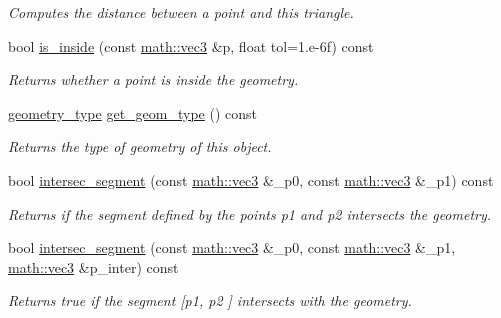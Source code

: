 \begin{DoxyCompactItemize}
\begin{DoxyCompactList}\small\item\em Computes the distance between a point and this triangle. \end{DoxyCompactList}\item 
bool \hyperlink{classphysim_1_1geometric_1_1triangle_a735cfae7db71f5d6105011c40595ca37}{is\+\_\+inside} (const \hyperlink{structphysim_1_1math_1_1vec3}{math\+::vec3} \&p, float tol=1.e-\/6f) const
\begin{DoxyCompactList}\small\item\em Returns whether a point is inside the geometry. \end{DoxyCompactList}\item 
\mbox{\label{classphysim_1_1geometric_1_1triangle_aaf161d99b93feace725fbd1fd4d1fc94}} 
\hyperlink{namespacephysim_1_1geometric_ac2794fff270c5b2ff4307f107a365fca}{geometry\+\_\+type} \hyperlink{classphysim_1_1geometric_1_1triangle_aaf161d99b93feace725fbd1fd4d1fc94}{get\+\_\+geom\+\_\+type} () const
\begin{DoxyCompactList}\small\item\em Returns the type of geometry of this object. \end{DoxyCompactList}\item 
bool \hyperlink{classphysim_1_1geometric_1_1triangle_ab5ca57fd95a11b4fd1754d6d35799f23}{intersec\+\_\+segment} (const \hyperlink{structphysim_1_1math_1_1vec3}{math\+::vec3} \&\+\_\+p0, const \hyperlink{structphysim_1_1math_1_1vec3}{math\+::vec3} \&\+\_\+p1) const
\begin{DoxyCompactList}\small\item\em Returns if the segment defined by the points {\itshape p1} and {\itshape p2} intersects the geometry. \end{DoxyCompactList}\item 
bool \hyperlink{classphysim_1_1geometric_1_1triangle_a013d124b88d40ddd698ed27047896bd0}{intersec\+\_\+segment} (const \hyperlink{structphysim_1_1math_1_1vec3}{math\+::vec3} \&\+\_\+p0, const \hyperlink{structphysim_1_1math_1_1vec3}{math\+::vec3} \&\+\_\+p1, \hyperlink{structphysim_1_1math_1_1vec3}{math\+::vec3} \&p\+\_\+inter) const
\begin{DoxyCompactList}\small\item\em Returns true if the segment \mbox{[}{\itshape p1}, {\itshape p2} \mbox{]} intersects with the geometry. \end{DoxyCompactList}\item 

\end{DoxyCompactItemize}
